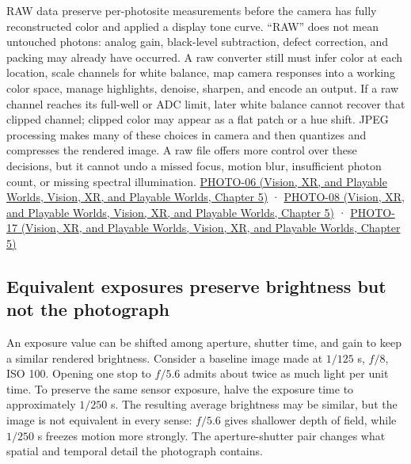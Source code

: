 RAW data preserve per-photosite measurements before the camera has fully reconstructed color and applied a display tone curve. ``RAW'' does not mean untouched photons: analog gain, black-level subtraction, defect correction, and packing may already have occurred. A raw converter still must infer color at each location, scale channels for white balance, map camera responses into a working color space, manage highlights, denoise, sharpen, and encode an output. If a raw channel reaches its full-well or ADC limit, later white balance cannot recover that clipped channel; clipped color may appear as a flat patch or a hue shift. JPEG processing makes many of these choices in camera and then quantizes and compresses the rendered image. A raw file offers more control over these decisions, but it cannot undo a missed focus, motion blur, insufficient photon count, or missing spectral illumination. \href{../07-Vision-XR-and-Playable-Worlds/main.pdf\#nameddest=04-visual-computing-ii-ch036-photo-06---photography-session-06}{PHOTO-06 (Vision, XR, and Playable Worlds, Vision, XR, and Playable Worlds, Chapter 5)} · \href{../07-Vision-XR-and-Playable-Worlds/main.pdf\#nameddest=04-visual-computing-ii-ch036-photo-08---photography-session-08}{PHOTO-08 (Vision, XR, and Playable Worlds, Vision, XR, and Playable Worlds, Chapter 5)} · \href{../07-Vision-XR-and-Playable-Worlds/main.pdf\#nameddest=04-visual-computing-ii-ch036-photo-17---photography-session-17}{PHOTO-17 (Vision, XR, and Playable Worlds, Vision, XR, and Playable Worlds, Chapter 5)}

\subsection{Equivalent exposures preserve brightness but not the photograph}\label{03-visual-computing-i-ch003-equivalent-exposures-preserve-brightness-but-not-the-photograph}

An exposure value can be shifted among aperture, shutter time, and gain to keep a similar rendered brightness. Consider a baseline image made at \(1/125\) s, \(f/8\), ISO 100. Opening one stop to \(f/5.6\) admits about twice as much light per unit time. To preserve the same sensor exposure, halve the exposure time to approximately \(1/250\) s. The resulting average brightness may be similar, but the image is not equivalent in every sense: \(f/5.6\) gives shallower depth of field, while \(1/250\) s freezes motion more strongly. The aperture-shutter pair changes what spatial and temporal detail the photograph contains.

